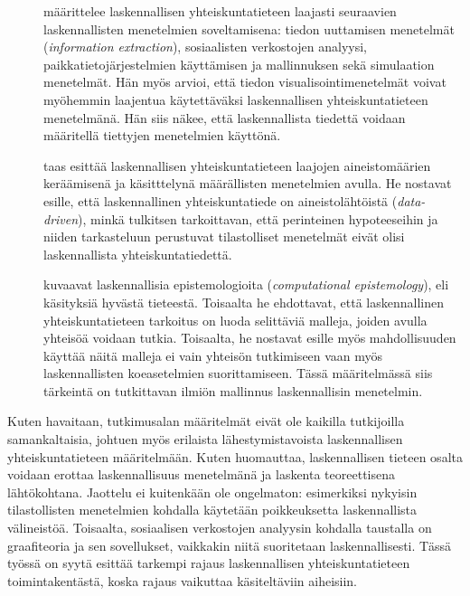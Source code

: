 \documentclass[finnish,gradu,twoside,12pt]{tktltiki}
\begin{document}
\begin{description}
\item[\citet{cioffi-revilla10}] määrittelee laskennallisen yhteiskuntatieteen laajasti seuraavien laskennallisten menetelmien soveltamisena: tiedon uuttamisen menetelmät (\textit{information extraction}), sosiaalisten verkostojen analyysi, paikkatietojärjestelmien käyttämisen ja mallinnuksen sekä simulaation menetelmät. Hän myös arvioi, että tiedon visualisointimenetelmät voivat myöhemmin laajentua käytettäväksi laskennallisen yhteiskuntatieteen menetelmänä. Hän siis näkee, että laskennallista tiedettä voidaan määritellä tiettyjen menetelmien käyttönä.
\item[\citet{lazer09}] taas esittää laskennallisen yhteiskuntatieteen laajojen aineistomäärien keräämisenä ja käsitttelynä määrällisten menetelmien avulla. He nostavat esille, että laskennallinen yhteiskuntatiede on aineistolähtöistä (\textit{data-driven}), minkä tulkitsen tarkoittavan, että perinteinen hypoteeseihin ja niiden tarkasteluun perustuvat tilastolliset menetelmät eivät olisi laskennallista yhteiskuntatiedettä.
\item[\cite{bankes02}] kuvaavat laskennallisia epistemologioita (\textit{computational epistemology}), eli käsityksiä hyvästä tieteestä. Toisaalta he ehdottavat, että laskennallinen yhteiskuntatieteen tarkoitus on luoda selittäviä malleja, joiden avulla yhteisöä voidaan tutkia. Toisaalta, he nostavat esille myös mahdollisuuden käyttää näitä malleja ei vain yhteisön tutkimiseen vaan myös laskennallisten koeasetelmien suorittamiseen. Tässä määritelmässä siis tärkeintä on tutkittavan ilmiön mallinnus laskennallisin menetelmin.
\end{description}

Kuten havaitaan, tutkimusalan määritelmät eivät ole kaikilla tutkijoilla samankaltaisia, johtuen myös erilaista lähestymistavoista laskennallisen yhteiskuntatieteen määritelmään. Kuten \citet{cioffi-revilla10} huomauttaa, laskennallisen tieteen osalta voidaan erottaa laskennallisuus menetelmänä ja laskenta teoreettisena lähtökohtana. Jaottelu ei kuitenkään ole ongelmaton: esimerkiksi nykyisin tilastollisten menetelmien kohdalla käytetään poikkeuksetta laskennallista välineistöä. Toisaalta, sosiaalisen verkostojen analyysin kohdalla taustalla on graafiteoria ja sen sovellukset, vaikkakin niitä suoritetaan laskennallisesti. Tässä työssä on syytä esittää tarkempi rajaus laskennallisen yhteiskuntatieteen toimintakentästä, koska rajaus vaikuttaa käsiteltäviin aiheisiin.
\end{document}
